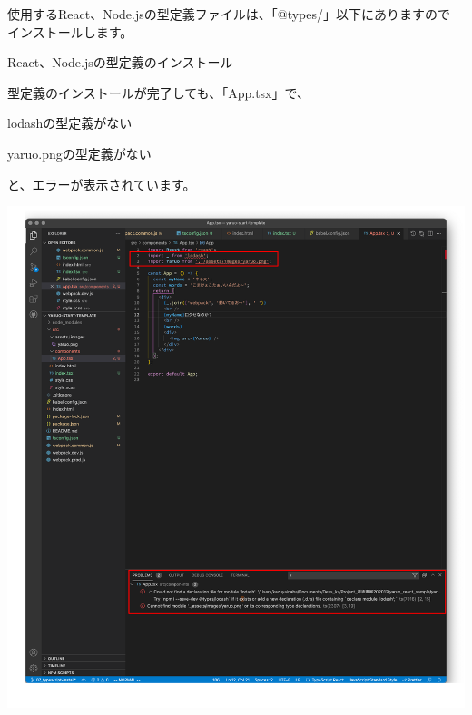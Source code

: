 \vspace*{\baselineskip}

使用するReact、Node.jsの型定義ファイルは、「@types/」以下にありますので
インストールします。

\def\startercodeblockfontsize{}
\begin{starterterminal}[]{React、Node.jsの型定義のインストール}\end{starterterminal}

型定義のインストールが完了しても、「App.tsx」で、

\begin{starteritemize}
\item lodashの型定義がない
\item yaruo.pngの型定義がない
\end{starteritemize}

と、エラーが表示されています。

\begin{reviewimage}[H]%
\includegraphics[width=0.7\maxwidth]{./images/02-create-react-app/typescript02.png}%
\label{image:02-create-react-app:typescript02}
\end{reviewimage}

